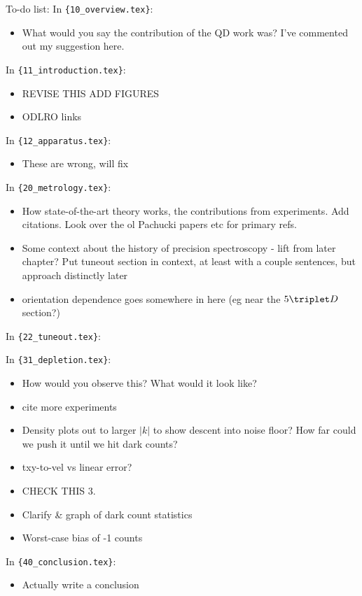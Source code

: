 To-do list:\newline
In \verb|{10_overview.tex}|:
\begin{itemize}
\item {What would you say the contribution of the QD work was? I've commented out my suggestion here.}
\end{itemize}
In \verb|{11_introduction.tex}|:
\begin{itemize}
\item {REVISE THIS ADD FIGURES}
\item {ODLRO links}
\end{itemize}
In \verb|{12_apparatus.tex}|:
\begin{itemize}
\item {These are wrong, will fix}
\end{itemize}
In \verb|{20_metrology.tex}|:
\begin{itemize}
\item {How state-of-the-art theory works, the contributions from experiments. Add citations. Look over the ol Pachucki papers etc for primary refs. }
\item {Some context about the history of precision spectroscopy - lift from later chapter? Put tuneout section in context, at least with a couple sentences, but approach distinctly later}
\item {orientation dependence goes somewhere in here (eg near the $5\triplet D$ section?)}
\end{itemize}
In \verb|{22_tuneout.tex}|:
\begin{itemize}
\item {Read these past measurements}
\item {The fit parameters are $f_{TO}
\item {Define also the chi squared stat}
\end{itemize}
In \verb|{31_depletion.tex}|:
\begin{itemize}
\item {How would you observe this?  What would it look like?}
\item {cite more experiments}
\item {Density plots out to larger $|k|$ to show descent into noise floor? How far could we push it until we hit dark counts?}
\item {txy-to-vel vs linear error?}
\item {CHECK THIS 3.}
\item {Clarify \& graph of dark count statistics}
\item {Worst-case bias of -1 counts}
\end{itemize}
In \verb|{40_conclusion.tex}|:
\begin{itemize}
\item {Actually write a conclusion}
\end{itemize}
